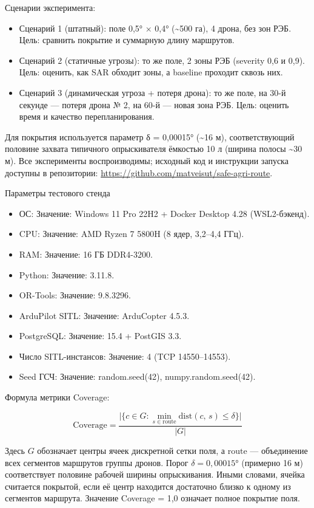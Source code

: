 \documentclass[14pt,a4paper]{extarticle}
\providecommand{\tightlist}{%
  \setlength{\itemsep}{0pt}\setlength{\parskip}{0pt}}
\begin{document}
Сценарии эксперимента:

\begin{itemize}
\tightlist
\item
  Сценарий 1 (штатный): поле 0,5° × 0,4° (\textasciitilde500 га), 4 дрона, без зон РЭБ. Цель: сравнить покрытие и суммарную длину маршрутов.
\item
  Сценарий 2 (статичные угрозы): то же поле, 2 зоны РЭБ (severity 0,6 и 0,9). Цель: оценить, как SAR обходит зоны, а baseline проходит сквозь них.
\item
  Сценарий 3 (динамическая угроза + потеря дрона): то же поле, на 30-й секунде --- потеря дрона № 2, на 60-й --- новая зона РЭБ. Цель: оценить время и качество перепланирования.
\end{itemize}

Для покрытия используется параметр δ = 0,00015° (\textasciitilde16 м), соответствующий половине захвата типичного опрыскивателя ёмкостью 10 л (ширина полосы \textasciitilde30 м). Все эксперименты воспроизводимы; исходный код и инструкции запуска доступны в репозитории: \url{https://github.com/matveisut/safe-agri-route}.

Параметры тестового стенда
\begin{itemize}
\item ОС: Значение: Windows 11 Pro 22H2 + Docker Desktop 4.28 (WSL2-бэкенд).
\item CPU: Значение: AMD Ryzen 7 5800H (8 ядер, 3,2–4,4 ГГц).
\item RAM: Значение: 16 ГБ DDR4-3200.
\item Python: Значение: 3.11.8.
\item OR-Tools: Значение: 9.8.3296.
\item ArduPilot SITL: Значение: ArduCopter 4.5.3.
\item PostgreSQL: Значение: 15.4 + PostGIS 3.3.
\item Число SITL-инстансов: Значение: 4 (TCP 14550–14553).
\item Seed ГСЧ: Значение: random.seed(42), numpy.random.seed(42).
\end{itemize}


Формула метрики Coverage:

\[\mathrm{Coverage} = \frac{\bigl|\{c \in G : \min_{s \in \mathrm{route}} \mathrm{dist}(c,\, s) \leq \delta\}\bigr|}{|G|}\]

Здесь \(G\) обозначает центры ячеек дискретной сетки поля, а \(\mathrm{route}\) --- объединение всех сегментов маршрутов группы дронов. Порог \(\delta = 0{,}00015°\) (примерно 16 м) соответствует половине рабочей ширины опрыскивания. Иными словами, ячейка считается покрытой, если её центр находится достаточно близко к одному из сегментов маршрута. Значение Coverage = 1,0 означает полное покрытие поля.
\end{document}
